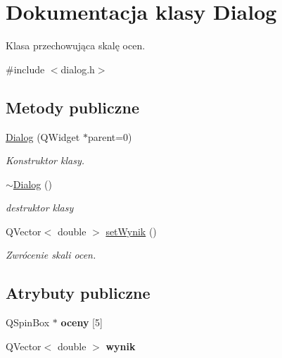 \hypertarget{classDialog}{\section{\-Dokumentacja klasy \-Dialog}
\label{classDialog}
}


\-Klasa przechowująca skalę ocen.  




{\ttfamily \#include $<$dialog.\-h$>$}

\subsection*{\-Metody publiczne}
\begin{DoxyCompactItemize}
\item 
\hypertarget{classDialog_acfa2063f9f962d394c6a645b6e7e08d8}{\hyperlink{classDialog_acfa2063f9f962d394c6a645b6e7e08d8}{\-Dialog} (\-Q\-Widget $\ast$parent=0)}\label{classDialog_acfa2063f9f962d394c6a645b6e7e08d8}

\begin{DoxyCompactList}\small\item\em \-Konstruktor klasy. \end{DoxyCompactList}\item 
\hypertarget{classDialog_a2a1fe6ef28513eed13bfcd3a4da83ccb}{\hyperlink{classDialog_a2a1fe6ef28513eed13bfcd3a4da83ccb}{$\sim$\-Dialog} ()}\label{classDialog_a2a1fe6ef28513eed13bfcd3a4da83ccb}

\begin{DoxyCompactList}\small\item\em destruktor klasy \end{DoxyCompactList}\item 
\-Q\-Vector$<$ double $>$ \hyperlink{classDialog_a135fc1d4bec50812c1497e77772509c9}{set\-Wynik} ()
\begin{DoxyCompactList}\small\item\em \-Zwrócenie skali ocen. \end{DoxyCompactList}\end{DoxyCompactItemize}
\subsection*{\-Atrybuty publiczne}
\begin{DoxyCompactItemize}
\item 
\hypertarget{classDialog_aa01e5bc7d931e74b3b34ff8f42a209af}{\-Q\-Spin\-Box $\ast$ {\bfseries oceny} \mbox{[}5\mbox{]}}\label{classDialog_aa01e5bc7d931e74b3b34ff8f42a209af}

\item 
\hypertarget{classDialog_a837df0e3c2d7dd02f581880d6fe59fad}{\-Q\-Vector$<$ double $>$ {\bfseries wynik}}\label{classDialog_a837df0e3c2d7dd02f581880d6fe59fad}

\end{DoxyCompactItemize}


